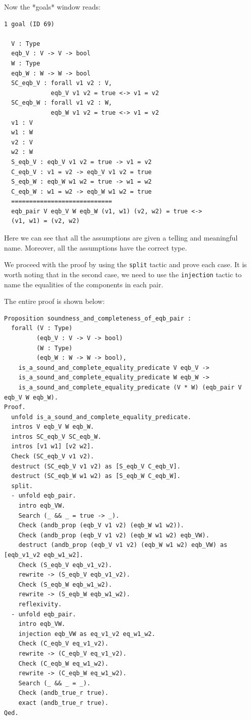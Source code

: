\documentclass{article}
\begin{document}
Now the *goals* window reads:

\begin{lstlisting}
1 goal (ID 69)
  
  V : Type
  eqb_V : V -> V -> bool
  W : Type
  eqb_W : W -> W -> bool
  SC_eqb_V : forall v1 v2 : V,
             eqb_V v1 v2 = true <-> v1 = v2
  SC_eqb_W : forall v1 v2 : W,
             eqb_W v1 v2 = true <-> v1 = v2
  v1 : V
  w1 : W
  v2 : V
  w2 : W
  S_eqb_V : eqb_V v1 v2 = true -> v1 = v2
  C_eqb_V : v1 = v2 -> eqb_V v1 v2 = true
  S_eqb_W : eqb_W w1 w2 = true -> w1 = w2
  C_eqb_W : w1 = w2 -> eqb_W w1 w2 = true
  ============================
  eqb_pair V eqb_V W eqb_W (v1, w1) (v2, w2) = true <->
  (v1, w1) = (v2, w2)
\end{lstlisting}

Here we can see that all the assumptions are given a telling and meaningful name. Moreover, all the assumptions have the correct type.

We proceed with the proof by using the \texttt{split} tactic and prove each case. It is worth noting that in the second case, we need to use the \texttt{injection} tactic to name the equalities of the components in each pair.

The entire proof is shown below:

\begin{lstlisting}
Proposition soundness_and_completeness_of_eqb_pair :
  forall (V : Type)
         (eqb_V : V -> V -> bool)
         (W : Type)
         (eqb_W : W -> W -> bool),
    is_a_sound_and_complete_equality_predicate V eqb_V ->
    is_a_sound_and_complete_equality_predicate W eqb_W ->
    is_a_sound_and_complete_equality_predicate (V * W) (eqb_pair V eqb_V W eqb_W).
Proof.
  unfold is_a_sound_and_complete_equality_predicate.
  intros V eqb_V W eqb_W.
  intros SC_eqb_V SC_eqb_W.
  intros [v1 w1] [v2 w2].
  Check (SC_eqb_V v1 v2).
  destruct (SC_eqb_V v1 v2) as [S_eqb_V C_eqb_V].
  destruct (SC_eqb_W w1 w2) as [S_eqb_W C_eqb_W].
  split.
  - unfold eqb_pair.
    intro eqb_VW.
    Search (_ && _ = true -> _).
    Check (andb_prop (eqb_V v1 v2) (eqb_W w1 w2)).
    Check (andb_prop (eqb_V v1 v2) (eqb_W w1 w2) eqb_VW).
    destruct (andb_prop (eqb_V v1 v2) (eqb_W w1 w2) eqb_VW) as [eqb_v1_v2 eqb_w1_w2].
    Check (S_eqb_V eqb_v1_v2).
    rewrite -> (S_eqb_V eqb_v1_v2).
    Check (S_eqb_W eqb_w1_w2).
    rewrite -> (S_eqb_W eqb_w1_w2).
    reflexivity.
  - unfold eqb_pair.
    intro eqb_VW.
    injection eqb_VW as eq_v1_v2 eq_w1_w2.
    Check (C_eqb_V eq_v1_v2).
    rewrite -> (C_eqb_V eq_v1_v2).
    Check (C_eqb_W eq_w1_w2).
    rewrite -> (C_eqb_W eq_w1_w2).
    Search (_ && _ = _).
    Check (andb_true_r true).
    exact (andb_true_r true).
Qed.
\end{lstlisting}
\end{document}
